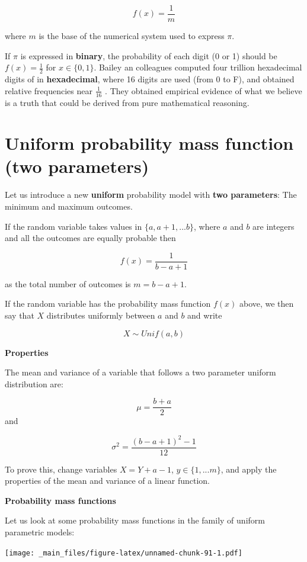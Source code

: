\documentclass[
]{book}
\begin{document}
\[
f(x) = \frac{1}{m}
\]

where \(m\) is the base of the numerical system used to express \(\pi\).

If \(\pi\) is expressed in \textbf{binary}, the probability of each digit (0 or 1) should be \(f(x) = \frac{1}{2}\) for \(x \in \{0,1\}\). Bailey an colleagues computed four trillion hexadecimal digits of
in \textbf{hexadecimal}, where 16 digits are used (from 0 to F), and obtained relative frequencies near \(\frac{1}{16}\) \citep{Bailey2012}. They obtained empirical evidence of what we believe is a truth that could be derived from pure mathematical reasoning.

\hypertarget{uniform-probability-mass-function-two-parameters}{%
\section{Uniform probability mass function (two parameters)}\label{uniform-probability-mass-function-two-parameters}}

Let us introduce a new \textbf{uniform} probability model with \textbf{two parameters}: The minimum and maximum outcomes.

If the random variable takes values in \(\{a, a+1, ...b\}\), where \(a\) and \(b\) are integers and all the outcomes are equally probable then

\[f(x)=\frac{1}{b-a+1}\]

as the total number of outcomes is \(m=b-a+1\).

If the random variable has the probability mass function \(f(x)\) above, we then say that \(X\) distributes uniformly between \(a\) and \(b\) and write

\[X \sim Unif(a,b)\]

\textbf{Properties}

The mean and variance of a variable that follows a two parameter uniform distribution are:

\[\mu= \frac{b+a}{2}\]
and

\[\sigma^2= \frac{(b-a+1)^2-1}{12}\]

To prove this, change variables \(X=Y+a-1\), \(y \in \{1,...m\}\), and apply the properties of the mean and variance of a linear function.

\textbf{Probability mass functions}

Let us look at some probability mass functions in the family of uniform parametric models:

\texttt{[image: \_main\_files/figure-latex/unnamed-chunk-91-1.pdf]}
\end{document}
